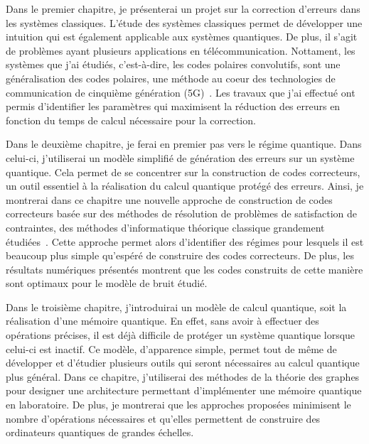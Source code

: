 Dans le premier chapitre,
je présenterai un projet sur la correction d'erreurs dans les systèmes classiques.
L'étude des systèmes classiques permet de développer une intuition qui est également
applicable aux systèmes quantiques.
De plus, il s'agit de problèmes ayant plusieurs applications en télécommunication.
Nottament,
les systèmes que j'ai étudiés,
c'est-à-dire, les codes polaires convolutifs,
sont une généralisation des codes polaires,
une méthode au coeur des technologies de communication de cinquième génération (5G)~\cite{arikan_rate_2009, bioglio_design_2021}.
Les travaux que j'ai effectué ont permis d'identifier les paramètres qui maximisent la réduction des erreurs
en fonction du temps de calcul nécessaire pour la correction.

Dans le deuxième chapitre,
je ferai en premier pas vers le régime quantique.
Dans celui-ci,
j'utiliserai un modèle simplifié de génération des erreurs sur un système quantique.
Cela permet de se concentrer sur la construction de codes correcteurs,
un outil essentiel à la réalisation du calcul quantique protégé des erreurs.
Ainsi,
je montrerai dans ce chapitre une nouvelle approche de construction de codes correcteurs
basée sur des méthodes de résolution de problèmes de satisfaction de contraintes,
des méthodes d'informatique théorique classique grandement étudiées~\cite{arora_computational_2009, noauthor_minizinc_nodate, noauthor_sat_nodate, achlioptas_rigorous_2005}.
Cette approche permet alors d'identifier des régimes pour lesquels il est beaucoup plus simple qu'espéré
de construire des codes correcteurs.
De plus,
les résultats numériques présentés montrent que les codes construits de cette manière
sont optimaux pour le modèle de bruit étudié.

Dans le troisième chapitre,
j'introduirai un modèle de calcul quantique,
soit la réalisation d'une mémoire quantique.
En effet,
sans avoir à effectuer des opérations précises,
il est déjà difficile de protéger un système quantique lorsque celui-ci est inactif.
Ce modèle,
d'apparence simple,
permet tout de même de développer et d'étudier plusieurs outils qui seront nécessaires
au calcul quantique plus général.
Dans ce chapitre,
j'utiliserai des méthodes de la théorie des graphes pour designer une architecture 
permettant d'implémenter une mémoire quantique en laboratoire.
De plus,
je montrerai que les approches proposées minimisent le nombre d'opérations nécessaires
et qu'elles permettent de construire des ordinateurs quantiques de grandes échelles.

